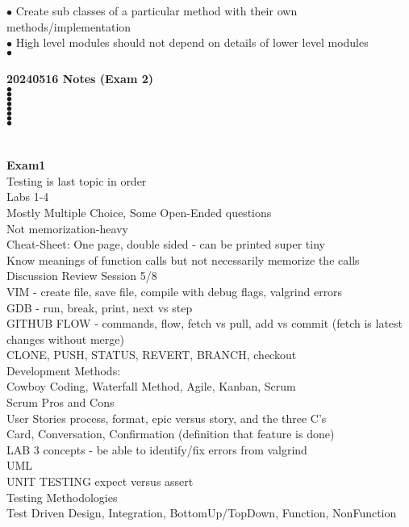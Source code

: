 \documentclass[11pt]{article}
\begin{document}
\indent\indent $\bullet$ Create sub classes of a particular method with their own methods/implementation \\
\indent\indent $\bullet$ High level modules should not depend on details of lower level modules \\
\indent\indent $\bullet$  \\
\\
\textbf{20240516 Notes (Exam 2)}\\
\indent $\bullet$  \\
\indent $\bullet$  \\
\indent $\bullet$  \\
\indent $\bullet$  \\
\indent $\bullet$  \\
\indent $\bullet$  \\
\indent $\bullet$  \\
\indent $\bullet$  \\
\\
\\
\textbf{Exam1}\\
\indent Testing is last topic in order \\
\indent Labs 1-4 \\
\indent Mostly Multiple Choice, Some Open-Ended questions\\
\indent Not memorization-heavy \\
\indent Cheat-Sheet: One page, double sided - can be printed super tiny \\
\indent Know meanings of function calls but not necessarily memorize the calls \\
\indent Discussion Review Session 5/8\\
\indent VIM - create file, save file, compile with debug flags, valgrind errors\\
\indent GDB - run, break, print, next vs step\\
\indent GITHUB FLOW - commands, flow, fetch vs pull, add vs commit (fetch is latest changes without merge)\\
\indent\indent CLONE, PUSH, STATUS, REVERT, BRANCH, checkout\\
\indent Development Methods:\\
\indent\indent Cowboy Coding, Waterfall Method, Agile, Kanban, Scrum\\
\indent Scrum Pros and Cons \\
\indent User Stories process, format, epic versus story, and the three C's \\
\indent\indent Card, Conversation, Confirmation (definition that feature is done)\\
\indent LAB 3 concepts - be able to identify/fix errors from valgrind  \\
\indent UML \\
\indent UNIT TESTING expect versus assert \\
\indent Testing Methodologies\\
\indent\indent Test Driven Design, Integration, BottomUp/TopDown, Function, NonFunction\\
\indent \\ 
\end{document}
